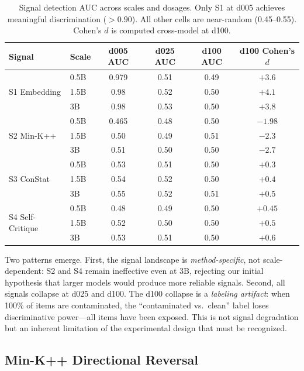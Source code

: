 \documentclass[11pt]{article}
\begin{document}
\begin{table}[t]
\centering
\caption{Signal detection AUC across scales and dosages. Only S1 at d005 achieves meaningful discrimination ($>0.90$). All other cells are near-random (0.45--0.55). Cohen's $d$ is computed cross-model at d100.}
\label{tab:signal_auc}
\small
\begin{tabular}{llcccc}
\toprule
Signal & Scale & d005 AUC & d025 AUC & d100 AUC & d100 Cohen's $d$ \\
\midrule
\multirow{3}{*}{S1 Embedding} & 0.5B & 0.979 & 0.51 & 0.49 & $+3.6$ \\
 & 1.5B & 0.98 & 0.52 & 0.50 & $+4.1$ \\
 & 3B & 0.98 & 0.53 & 0.50 & $+3.8$ \\
\midrule
\multirow{3}{*}{S2 Min-K++} & 0.5B & 0.465 & 0.48 & 0.50 & $\mathbf{-1.98}$ \\
 & 1.5B & 0.50 & 0.49 & 0.51 & $\mathbf{-2.3}$ \\
 & 3B & 0.51 & 0.50 & 0.50 & $\mathbf{-2.7}$ \\
\midrule
\multirow{3}{*}{S3 ConStat} & 0.5B & 0.53 & 0.51 & 0.50 & $+0.3$ \\
 & 1.5B & 0.54 & 0.52 & 0.50 & $+0.4$ \\
 & 3B & 0.55 & 0.52 & 0.51 & $+0.5$ \\
\midrule
\multirow{3}{*}{S4 Self-Critique} & 0.5B & 0.48 & 0.49 & 0.50 & $+0.45$ \\
 & 1.5B & 0.52 & 0.50 & 0.50 & $+0.5$ \\
 & 3B & 0.53 & 0.51 & 0.50 & $+0.6$ \\
\bottomrule
\end{tabular}
\end{table}

Two patterns emerge.
First, the signal landscape is \emph{method-specific}, not scale-dependent: S2 and S4 remain ineffective even at 3B, rejecting our initial hypothesis that larger models would produce more reliable signals.
Second, all signals collapse at d025 and d100.
The d100 collapse is a \emph{labeling artifact}: when 100\% of items are contaminated, the ``contaminated vs.\ clean'' label loses discriminative power---all items have been exposed.
This is not signal degradation but an inherent limitation of the experimental design that must be recognized.

\subsection{Min-K++ Directional Reversal}
\label{sec:minkpp}
\end{document}
